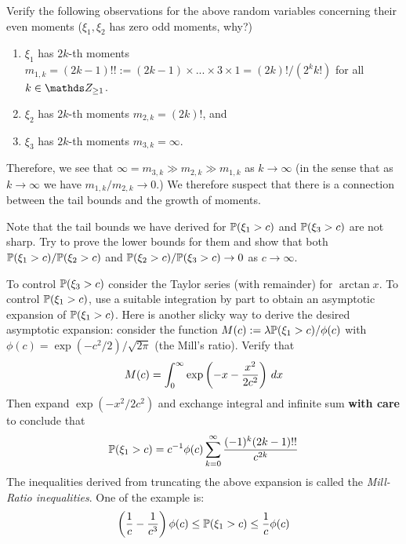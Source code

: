 {\begin{exercise} Verify the following observations for the above random variables concerning their even moments ($\xi_1, \xi_2$ has zero odd moments, why?)
\begin{enumerate}
    \item $\xi_1$ has $2k$-th moments $m_{1,k} = (2k-1)!! := (2k-1) \times ... \times 3 \times 1 = (2k)!/(2^k k!)$ for all $k \in \Z_{\geq 1}$.
    \item $\xi_2$ has $2k$-th moments $m_{2,k} = (2k)!$, and
    \item $\xi_3$ has $2k$-th moments $m_{3,k} = \infty$.
\end{enumerate}

Therefore, we see that $\infty = m_{3,k} \gg m_{2,k} \gg m_{1,k}$ as $k \to \infty$ (in the sense that as $k \to \infty$ we have $m_{1,k}/m_{2,k} \to 0$.) We therefore suspect that there is a connection between the tail bounds and the growth of moments. 
\end{exercise}}

\begin{unexaminable}
\begin{exercise}
Note that the tail bounds we have derived for $\mathbb{P}(\xi_1 > c)$ and $\mathbb{P}(\xi_3 > c)$ are not sharp. Try to prove the lower bounds for them and show that both $\mathbb{P}(\xi_1 > c)/\mathbb{P}(\xi_2 > c)$ and $\mathbb{P}(\xi_2 > c) / \mathbb{P}(\xi_3 > c) \to 0$ as $c \to \infty$.
\end{exercise}

\begin{hint}
To control $\mathbb{P}(\xi_3 > c)$ consider the Taylor series (with remainder) for $\arctan{x}$. To control $\mathbb{P}(\xi_1 > c)$, use a suitable integration by part to obtain an asymptotic expansion of $\mathbb{P}(\xi_1 > c)$. Here is another slicky way to derive the desired asymptotic expansion: consider the function $M(c) := \lambda \mathbb{P}(\xi_1 > c) / \phi(c)$ with $\phi(c) = \exp(-c^2/2)/\sqrt{2\pi}$ (the Mill's ratio). Verify that
\begin{equation}
    M(c) = \int_0^\infty \exp\left( -x - \frac{x^2}{2c^2} \right) \, dx
\end{equation}
Then expand $\exp(-x^2/2c^2)$ and exchange integral and infinite sum \textbf{with care} to conclude that
\begin{equation} \label{eq:Mill_expansion}
    \mathbb{P}(\xi_1 > c) = c^{-1} \phi(c) \sum_{k=0}^\infty \frac{(-1)^k (2k-1)!!}{c^{2k}}
\end{equation}
The inequalities derived from truncating the above expansion is called the \textit{Mill-Ratio inequalities}. One of the example is:
\begin{equation} \label{eq:Mill_Ratio_basic}
    \left( \frac{1}{c} - \frac{1}{c^3} \right) \phi(c) \leq \mathbb{P}(\xi_1 > c) \leq \frac{1}{c} \phi(c)
\end{equation}
\end{hint}
\end{unexaminable}

